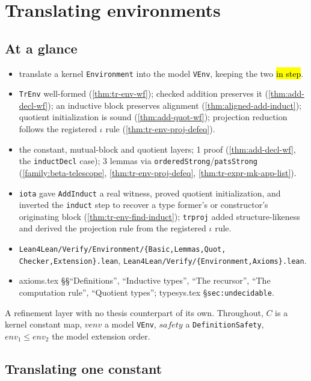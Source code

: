 \chapter{Translating environments}
\label{chap:trenv}

\section*{At a glance}
\begin{itemize}
\item {} translate a kernel \texttt{Environment} into the model \texttt{VEnv},
keeping the two \hl{in step}.
\item {} \texttt{TrEnv} well-formed (\ref{thm:tr-env-wf}); checked
addition preserves it (\ref{thm:add-decl-wf}); an inductive block preserves alignment
(\ref{thm:aligned-add-induct}); quotient initialization is sound (\ref{thm:add-quot-wf});
projection reduction follows the registered $\iota$ rule (\ref{thm:tr-env-proj-defeq}).
\item {} \stProved{} the constant, mutual-block and quotient layers;
\stSorry{} 1 proof (\ref{thm:add-decl-wf}, the \texttt{inductDecl} case); \stTainted{} 3
lemmas via \texttt{orderedStrong}/\texttt{patsStrong} (\ref{family:beta-telescope},
\ref{thm:tr-env-proj-defeq}, \ref{thm:tr-expr-mk-app-list}).
\item {} \texttt{iota} gave \texttt{AddInduct} a real witness, proved
quotient initialization, and inverted the \texttt{induct} step to recover a type
former's or constructor's originating block (\ref{thm:tr-env-find-induct}); \texttt{trproj}
added structure-likeness and derived the projection rule from the registered $\iota$ rule.
\item {} \texttt{Lean4Lean/Verify/Environment/\{Basic,Lemmas,Quot,
Checker,Extension\}.lean}, \texttt{Lean4Lean/Verify/\{Environment,Axioms\}.lean}.
\item {} axioms.tex \S\S ``Definitions'', ``Inductive types'', ``The recursor'',
``The computation rule'', ``Quotient types''; typesys.tex \S\texttt{sec:undecidable}.
\end{itemize}

A refinement layer with no thesis counterpart of its own. Throughout, $C$ is a kernel
constant map, $venv$ a model \texttt{VEnv}, $safety$ a \texttt{DefinitionSafety},
$env_1 \le env_2$ the model extension order.

\section{Translating one constant}

